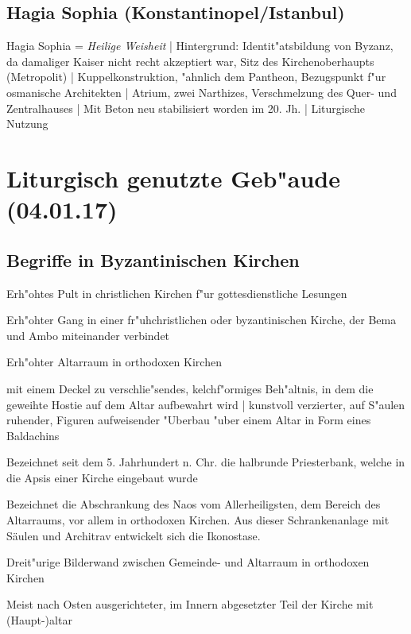 \documentclass[emulatestandardclasses]{scrartcl}
\begin{document}
\subsection{Hagia Sophia (Konstantinopel/Istanbul)}
Hagia Sophia = \emph{Heilige Weisheit} | Hintergrund: Identit"atsbildung von Byzanz, da damaliger Kaiser nicht recht akzeptiert war, Sitz des Kirchenoberhaupts (Metropolit) | Kuppelkonstruktion, "ahnlich dem Pantheon, Bezugspunkt f"ur osmanische Architekten | Atrium, zwei Narthizes, Verschmelzung des Quer- und Zentralhauses | Mit Beton neu stabilisiert worden im 20. Jh. | Liturgische Nutzung


\section{Liturgisch genutzte Geb"aude\\(04.01.17)}

\subsection{Begriffe in Byzantinischen Kirchen}
\begin{description}[leftmargin=!,labelwidth=\widthof{\bfseries Synthronon}]
  \item[Ambo] Erh"ohtes Pult in christlichen Kirchen f"ur gottesdienstliche Lesungen
  \item[Solea] Erh"ohter Gang in einer fr"uhchristlichen oder byzantinischen Kirche, der Bema und Ambo miteinander verbindet
  \item[Bema] Erh"ohter Altarraum in orthodoxen Kirchen
  \item[Ziborium] mit einem Deckel zu verschlie"sendes, kelchf"ormiges Beh"altnis, in dem die geweihte Hostie auf dem Altar aufbewahrt wird | kunstvoll verzierter, auf S"aulen ruhender, Figuren aufweisender "Uberbau "uber einem Altar in Form eines Baldachins
  \item[Synthronon] Bezeichnet seit dem 5. Jahrhundert n. Chr. die halbrunde Priesterbank, welche in die Apsis einer Kirche eingebaut wurde
  \item[Templon] Bezeichnet die Abschrankung des Naos vom Allerheiligsten, dem Bereich des Altarraums, vor allem in orthodoxen Kirchen. Aus dieser Schrankenanlage mit Säulen und Architrav entwickelt sich die Ikonostase.
  \item[Ikonostase] Dreit"urige Bilderwand zwischen Gemeinde- und Altarraum in orthodoxen Kirchen
  \item[Chor] Meist nach Osten ausgerichteter, im Innern abgesetzter Teil der Kirche mit (Haupt-)altar
\end{description}
\end{document}
